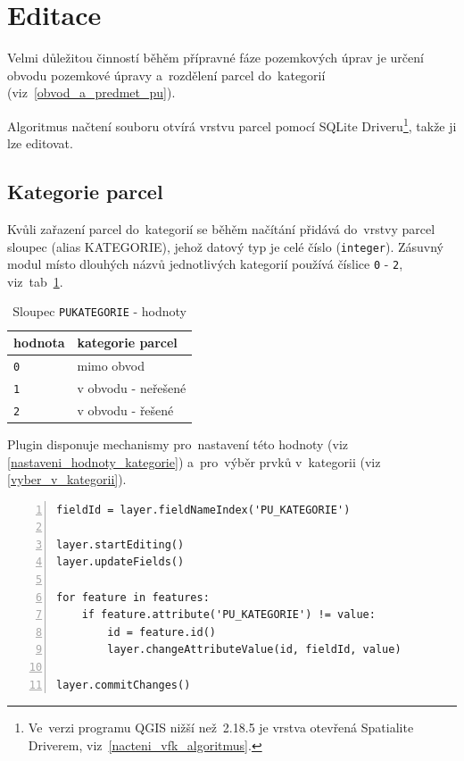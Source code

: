 \newpage

\section{Editace}
\label{editace}

Velmi důležitou činností běhěm přípravné fáze pozemkových úprav je určení obvodu pozemkové úpravy a~rozdělení parcel do~kategorií (viz~\ref{obvod_a_predmet_pu}).

Algoritmus načtení  souboru otvírá vrstvu parcel pomocí SQLite Driveru\footnote{Ve~verzi programu QGIS nižší než~2.18.5 je vrstva otevřená Spatialite Driverem, viz~\ref{nacteni_vfk_algoritmus}.}, takže ji lze editovat.

\subsection{Kategorie parcel}
\label{kategorie_parcel}

Kvůli zařazení parcel do~kategorií se běhěm načítání přidává do~vrstvy parcel sloupec \texttt{} (alias KATEGORIE), jehož datový typ je celé číslo (\texttt{integer}). Zásuvný modul místo dlouhých názvů jednotlivých kategorií používá číslice \texttt{0} - \texttt{2}, viz~tab~\ref{tab:kategorie_hodnoty}. 

\begin{table}[H]
    \begin{tabular}{|l|l|}
        \hline
         hodnota & kategorie parcel \\
        \hline
        \hline
          \texttt{0} & mimo obvod \\ \hline
          \texttt{1} & v obvodu - neřešené \\ \hline          
          \texttt{2} & v obvodu - řešené \\
         \hline
    \end{tabular}
    \centering
    \caption[Sloupec \texttt{PU\textunderscore KATEGORIE} - hodnoty]{Sloupec \texttt{PU\textunderscore KATEGORIE} - hodnoty}
    \label{tab:kategorie_hodnoty}
\end{table}

Plugin disponuje mechanismy pro~nastavení této hodnoty (viz \ref{nastaveni_hodnoty_kategorie}) a~pro~výběr prvků v~kategorii (viz \ref{vyber_v_kategorii}).

{\scriptsize
\begin{lstlisting}[style=python, caption={Kategorie parcel - nastavení hodnoty}, captionpos=b, label=nastaveni_hodnoty_kategorie, backgroundcolor = \color{light-gray},  numbers=left]
fieldId = layer.fieldNameIndex('PU_KATEGORIE')

layer.startEditing()
layer.updateFields()

for feature in features:
    if feature.attribute('PU_KATEGORIE') != value:
        id = feature.id()
        layer.changeAttributeValue(id, fieldId, value)

layer.commitChanges()
\end{lstlisting}}

